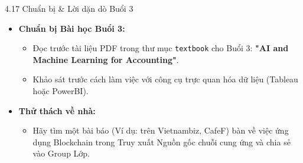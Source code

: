 \documentclass[aspectratio=169]{beamer}
\begin{document}
\begin{frame}{4.17 Chuẩn bị \& Lời dặn dò Buổi 3}
    \begin{itemize}
        \item \textbf{Chuẩn bị Bài học Buổi 3:}
        \begin{itemize}
            \item Đọc trước tài liệu PDF trong thư mục \texttt{textbook} cho Buổi 3: \textbf{"AI and Machine Learning for Accounting"}.
            \item Khảo sát trước cách làm việc với công cụ trực quan hóa dữ liệu (Tableau hoặc PowerBI).
        \end{itemize}
        \item \textbf{Thử thách về nhà:}
        \begin{itemize}
            \item Hãy tìm một bài báo (Ví dụ: trên Vietnambiz, CafeF) bàn về việc ứng dụng Blockchain trong Truy xuất Nguồn gốc chuỗi cung ứng và chia sẻ vào Group Lớp.
        \end{itemize}
    \end{itemize}
\end{frame}
\end{document}
